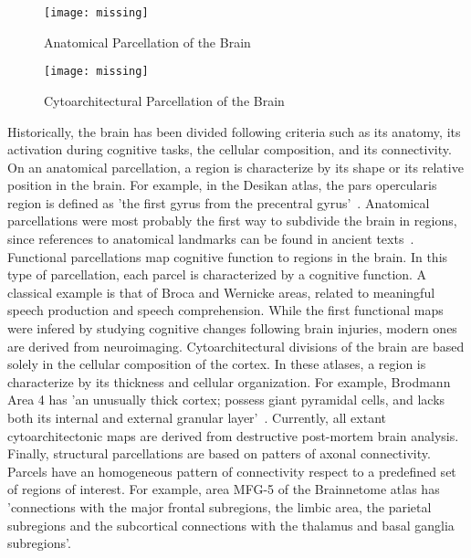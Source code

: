\begin{figure}[h!]
    \texttt{[image: missing]}
    \caption{Anatomical Parcellation of the Brain}
    \label{fig:brain_function}
\end{figure}

\begin{figure*}[t!]
    \texttt{[image: missing]}
    \caption{Cytoarchitectural Parcellation of the Brain}
    \label{fig:brain_function}
\end{figure*}

Historically, the brain has been divided following criteria such as its anatomy,
its activation during cognitive tasks, the cellular composition, and its connectivity.
On an anatomical parcellation, a region is characterize by its shape or its
relative position in the brain. For example, in the Desikan atlas,
the pars opercularis region is defined as 'the first gyrus from the precentral
gyrus'~\cite{Desikan2006}. Anatomical parcellations were most probably the first way to subdivide
the brain in regions, since references to anatomical landmarks can be found
in ancient texts~\cite{Elsberg1945, Collice2008}. Functional parcellations
map cognitive function to regions in the brain. In this type of parcellation,
each parcel is characterized by a cognitive function. A classical example is that
of Broca and Wernicke areas, related to meaningful speech production and speech
comprehension. While the first functional maps were infered by studying cognitive
changes following brain injuries, modern ones are derived from neuroimaging.
Cytoarchitectural divisions of the brain are
based solely in the cellular composition of the cortex. In these atlases, a region
is characterize by its thickness and cellular organization. For example,
Brodmann Area 4 has 'an unusually thick cortex; possess giant pyramidal cells,
and lacks both its internal and external granular layer'~\cite{Brodmann1909}.
Currently, all extant cytoarchitectonic maps are derived from destructive
post-mortem brain analysis.
Finally, structural parcellations are based on patters of axonal connectivity. Parcels have an
homogeneous pattern of connectivity respect to a predefined set of regions of
interest. For example, area MFG-5 of the Brainnetome atlas has 'connections 
with the major frontal subregions, the limbic area, the parietal subregions
and the subcortical connections with the thalamus and basal ganglia subregions'\cite{Fan2016}.

